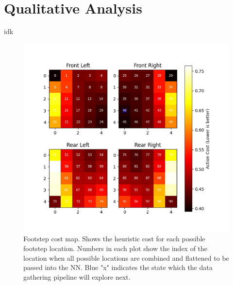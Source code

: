 \section{Qualitative Analysis}

\begin{outline}
  idk
\end{outline}

\begin{figure}
  \centering
  \includegraphics[width=0.75\linewidth]{images/data/footstep-cost-map.png}
  \caption{Footstep cost map. Shows the heuristic cost for each
    possible footstep location. Numbers in each plot show the index of
    the location when all possible locations are combined and flattened
    to be passed into the NN. Blue "x" indicates the state which the
  data gathering pipeline will explore next.}
  \label{fig:data-footstep-cost-map}
\end{figure}
